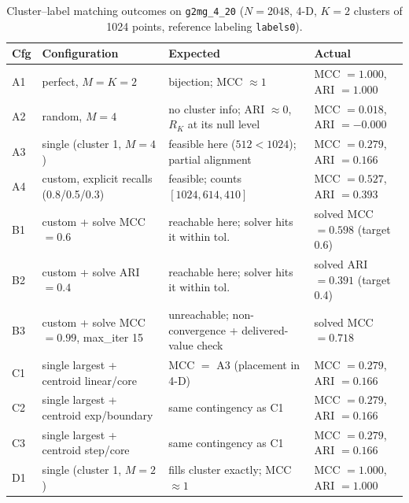 \documentclass[a4paper,12pt]{article}
\begin{document}
\begin{table}[!h]
\centering\tiny
\begin{tabular}{@{}l p{3.5cm} p{4.0cm} p{4.6cm}@{}}
\toprule
\textbf{Cfg} & \textbf{Configuration} & \textbf{Expected} & \textbf{Actual} \\
\midrule
A1 & perfect, $M{=}K{=}2$ & bijection; MCC $\approx 1$ & MCC $=1.000$, ARI $=1.000$\\
A2 & random, $M{=}4$ & no cluster info; ARI $\approx 0$, $R_K$ at its null level & MCC $=0.018$, ARI $=-0.000$\\
A3 & single (cluster 1, $M{=}4$) & feasible here ($512<1024$); partial alignment & MCC $=0.279$, ARI $=0.166$\\
A4 & custom, explicit recalls (0.8/0.5/0.3) & feasible; counts $[1024,614,410]$ & MCC $=0.527$, ARI $=0.393$\\
B1 & custom + solve MCC$=0.6$ & reachable here; solver hits it within tol. & solved MCC $=0.598$ (target 0.6)\\
B2 & custom + solve ARI$=0.4$ & reachable here; solver hits it within tol. & solved ARI $=0.391$ (target 0.4)\\
B3 & custom + solve MCC$=0.99$, max\_iter 15 & unreachable; non-convergence + delivered-value check & solved MCC $=0.718$\\
C1 & single largest + centroid linear/core & MCC $=$ A3 (placement in 4-D) & MCC $=0.279$, ARI $=0.166$\\
C2 & single largest + centroid exp/boundary & same contingency as C1 & MCC $=0.279$, ARI $=0.166$\\
C3 & single largest + centroid step/core & same contingency as C1 & MCC $=0.279$, ARI $=0.166$\\
D1 & single (cluster 1, $M{=}2$) & fills cluster exactly; MCC $\approx 1$ & MCC $=1.000$, ARI $=1.000$\\
\bottomrule
\end{tabular}
\caption{Cluster--label matching outcomes on \texttt{g2mg\_4\_20} ($N=2048$, 4-D, $K=2$ clusters of 1024 points, reference labeling \texttt{labels0}).}
\label{tab:g2mg-outcomes}
\end{table}
\end{document}
